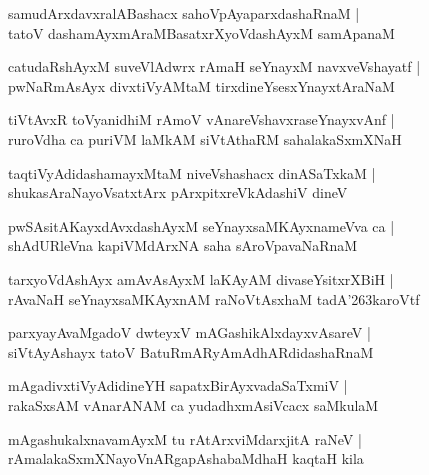 \documentclass[twoside,12pt,openright]{book}
\def\S{\char'263}
\newcounter{shloka}[chapter]
\begin{document}
\begin{shloka}%
samudArxdavxralABashacx sahoVpAyaparxdashaRnaM |\\
tatoV dashamAyxmAraMBasatxrXyoVdashAyxM samApanaM 
\end{shloka}

\begin{shloka}%
catudaRshAyxM suveVlAdwrx rAmaH seYnayxM navxveVshayatf |\\
pwNaRmAsAyx divxtiVyAMtaM tirxdineYsesxYnayxtAraNaM 
\end{shloka}

\begin{shloka}%
tiVtAvxR toVyanidhiM rAmoV vAnareVshavxraseYnayxvAnf |\\
ruroVdha ca puriVM laMkAM siVtAthaRM sahalakaSxmXNaH 
\end{shloka}

\begin{shloka}%
taqtiVyAdidashamayxMtaM niveVshashacx dinASaTxkaM |\\
shukasAraNayoVsatxtArx pArxpitxreVkAdashiV dineV
\end{shloka}

\begin{shloka}%
pwSAsitAKayxdAvxdashAyxM seYnayxsaMKAyxnameVva ca |\\
shAdURleVna kapiVMdArxNA saha sAroVpavaNaRnaM 
\end{shloka}

\begin{shloka}%
tarxyoVdAshAyx amAvAsAyxM laKAyAM divaseYsitxrXBiH |\\
rAvaNaH seYnayxsaMKAyxnAM raNoVtAsxhaM tadA\S karoVtf 
\end{shloka}

\begin{shloka}%
parxyayAvaMgadoV dwteyxV mAGashikAlxdayxvAsareV |\\
siVtAyAshayx tatoV BatuRmARyAmAdhARdidashaRnaM 
\end{shloka}

\begin{shloka}%
mAgadivxtiVyAdidineYH sapatxBirAyxvadaSaTxmiV |\\
rakaSxsAM vAnarANAM ca yudadhxmAsiVcacx saMkulaM 
\end{shloka}

\begin{shloka}%
mAgashukalxnavamAyxM tu rAtArxviMdarxjitA raNeV |\\
rAmalakaSxmXNayoVnARgapAshabaMdhaH kaqtaH kila
\end{shloka}
\end{document}
